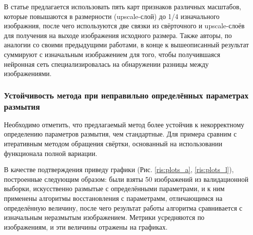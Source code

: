 В статье предлагается использовать пять карт признаков различных масштабов, которые повышаются в размерности (upscale-слой) до 1/4 изначального изображния, после чего используются две связки из свёрточного и upscale-слоёв для получения на выходе изображения исходного размера. Также авторы, по аналогии со своими предыдущими работами, в конце к вышеописанный результат суммируют с изначальным изображением для того, чтобы получившаяся нейронная сеть специализировалась на обнаружении разницы между изображениями.

\subsubsection{Устойчивость метода при неправильно определённых параметрах размытия}

Необходимо отметить, что предлагаемый метод более устойчив к некорректному определению параметров размытия, чем стандартные. Для примера сравним с итеративным методом обращения свёртки, основанный на использовании функционала полной вариации. 

В качестве подтверждения приведу графики (Рис. \ref{ris:plots_a}, \ref{ris:plots_l}), построенные следующим образом: были взяты 50 изображений из валидационной выборки, искусственно размытые с определёнными параметрами, и к ним применены алгоритмы восстановления с параметрамм, отличающимся на определённую величину, после чего результат работы алгоритма сравнивается с изначальным неразмытым изображением. Метрики усредняются по изображениям, и эти величины отражены на графиках.

